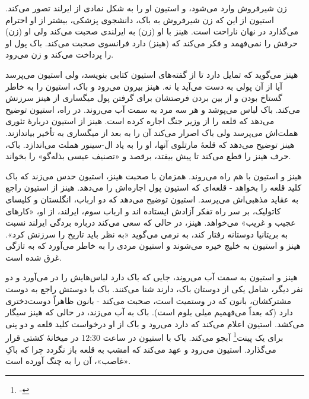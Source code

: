 \documentclass[12pt]{book}
\begin{document}
    زن شیرفروش وارد می‌شود، و استیون او را به شکل نمادی از ایرلند تصور می‌کند. استیون از این که زن شیرفروش به باک، دانشجوی پزشکی، بیشتر از او احترام می‌گذارد در نهان ناراحت است. هینز با او (زن) به ایرلندی صحبت می‌کند ولی او (زن) حرفش را نمی‌فهمد و فکر می‌کند که (هینز) دارد فرانسوی صحبت می‌کند. باک پول او را پرداخت می‌کند و زن می‌رود.

    هینز می‌گوید که تمایل دارد تا از گفته‌های استیون کتابی بنویسد، ولی استیون می‌پرسد آیا از آن پولی به دست می‌آید یا نه. هینز بیرون می‌رود و باک، استیون را به خاطر گستاخ بودن و از بین بردن فرصتشان برای گرفتن پول میگساری از هینز سرزنش می‌کند. باک لباس می‌پوشد و هر سه مرد به سمت آب می‌روند. در راه، استیون توضیح می‌دهد که قلعه را از وزیر جنگ اجاره کرده است. هینز از استیون دربارۀ تئوری هملت‌اش می‌پرسد ولی باک اصرار می‌کند آن را به بعد از میگساری به تأخیر بیاندازند. هینز توضیح می‌دهد که قلعۀ مارتلوی آنها، او را به یاد ال-سینور هملت می‌اندازد. باک، حرف هینز را قطع می‌کند تا پیش بیفتد، برقصد و «تصنیف عیسی بذله‌گو» را بخواند.

    هینز و استیون با هم راه می‌روند. همزمان با صحبت هینز، استیون حدس می‌زند که باک کلید قلعه را بخواهد - قلعه‌ای که استیون پول اجاره‌اش را می‌دهد. هینز از استیون راجع به عقاید مذهبی‌اش می‌پرسد. استیون توضیح می‌دهد که دو ارباب، انگلستان و کلیسای کاتولیک، بر سر راه تفکر آزادش ایستاده اند و ارباب سوم، ایرلند، از او، «کارهای عجیب و غریب» می‌خواهد. هینز، در حالی که سعی می‌کند درباره بردگی ایرلند نسبت به بریتانیا دوستانه رفتار کند، به نرمی می‌گوید «به نظر باید تاریخ را سرزنش کرد». هینز و استیون به خلیج خیره می‌شوند و استیون مردی را به خاطر می‌آورد که به تازگی غرق شده است.

    هینز و استیون به سمت آب می‌روند، جایی که باک دارد لباس‌هایش را در می‌آورد و دو نفر دیگر، شامل یکی از دوستان باک، دارند شنا می‌کنند. باک با دوستش راجع به دوست مشترکشان، بانون که در وستمیث است، صحبت می‌کند - بانون ظاهراً دوست‌دختری دارد (که بعداً می‌فهمیم میلی بلوم است). باک به آب می‌زند، در حالی که هینز سیگار می‌کشد. استیون اعلام می‌کند که دارد می‌رود و باک از او درخواست کلید قلعه و دو پنی برای یک پینت\footnote{-} آبجو می‌کند. باک با استیون در ساعت 12:30 در میخانۀ کشتی قرار می‌گذارد. استیون می‌رود و عهد می‌کند که امشب به قلعه باز نگردد چرا که باکِ «غاصب»، آن را به چنگ آورده است.
\end{document}
